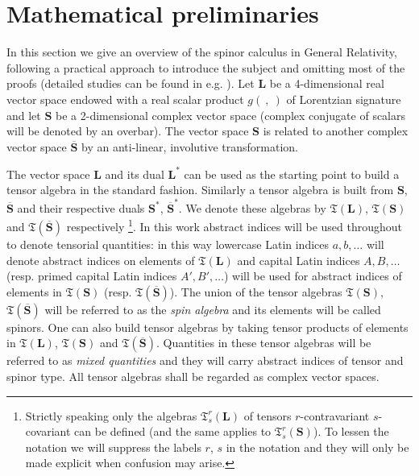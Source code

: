 \documentclass[final,3p,times,twocolumn]{elsarticle}
\begin{document}
\section{Mathematical preliminaries}
\label{sec:preliminaries}
In this section we give an overview of the spinor calculus in General Relativity, 
following a practical approach to introduce the subject and omitting most of the proofs
(detailed studies can be found in e.g. \cite{PR-RINDLER-1,ASHTEKAR}). 
Let $\mathbf L$ be a 4-dimensional real vector space endowed with a real scalar product 
$g(\ ,\ )$ of Lorentzian signature and let $\mathbf S$ be a 2-dimensional complex vector space (complex conjugate of scalars
will be denoted by an overbar). 
The vector space $\mathbf S$ is related to another complex vector space $\overline{\mathbf S}$
by an anti-linear, involutive transformation.  

The vector space $\mathbf L$ and its dual ${\mathbf L}^*$ can be used as the starting point to 
build a tensor algebra in the standard fashion. Similarly a tensor algebra is built 
from $\mathbf S$, $\overline{\mathbf S}$ and their respective duals ${\mathbf S}^*$, 
$\overline{\mathbf S}^*$. We denote these algebras by $\mathfrak{T}(\mathbf{L})$, 
$\mathfrak{T}(\mathbf{S})$ and 
$\mathfrak{T}(\overline{\mathbf{S}})$ respectively 
\footnote{Strictly speaking only the algebras $\mathfrak{T}^r_s(\mathbf L)$ 
of tensors $r$-contravariant $s$-covariant can be defined (and the same applies 
to $\mathfrak{T}^{r}_{s}(\mathbf S)$). To lessen the notation we will suppress the 
labels $r$, $s$ in the notation and they will only be made explicit when confusion may arise.}. 
In this work abstract indices will be used throughout to denote tensorial quantities: in this 
way lowercase Latin indices $a,b,\dots$ will denote abstract indices on elements of 
$\mathfrak{T}(\mathbf{L})$ and capital Latin indices $A,B,\dots$ 
(resp. primed capital Latin indices $A',B',\dots$) will be used for 
abstract indices of elements in $\mathfrak{T}(\mathbf{S})$ 
(resp. $\mathfrak{T}(\overline{\mathbf{S}})$). 
The union of the tensor algebras $\mathfrak{T}(\mathbf{S})$, 
$\mathfrak{T}(\overline{\mathbf{S}})$ will be referred to as the 
{\em spin algebra} and its elements will be called spinors. 
One can also build tensor algebras by taking tensor products of 
elements in $\mathfrak{T}(\mathbf L)$, $\mathfrak{T}(\mathbf S)$ 
and $\mathfrak{T}(\overline{\mathbf{S}})$. Quantities in these 
tensor algebras will be referred to as {\em mixed quantities} 
and they will carry abstract indices of tensor and spinor type. 
All tensor algebras shall be regarded as complex vector spaces.
\end{document}
